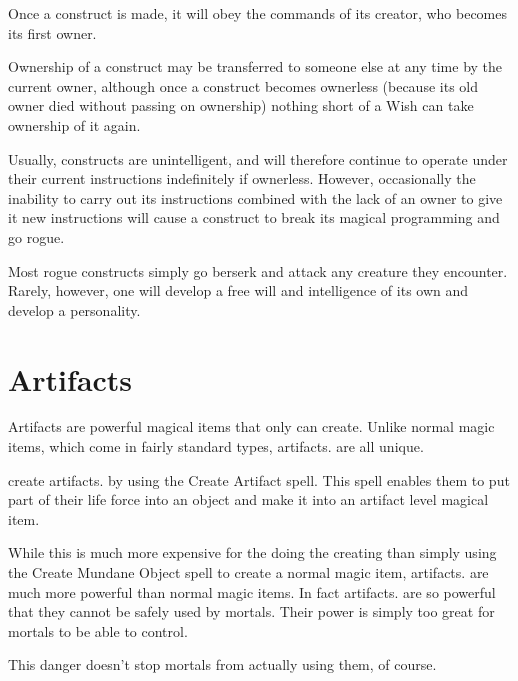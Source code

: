 \begin{multicols*}{2}

Once a construct is made, it will obey the commands of its creator, who becomes its first owner.

Ownership of a construct may be transferred to someone else at any time by the current owner, although once a construct becomes ownerless (because its old owner died without passing on ownership) nothing short of a Wish can take ownership of it again.

Usually, constructs are unintelligent, and will therefore continue to operate under their current instructions indefinitely if ownerless. However, occasionally the inability to carry out its instructions combined with the lack of an owner to give it new instructions will cause a construct to break its magical programming and go rogue.

Most rogue constructs simply go berserk and attack any creature they encounter. Rarely, however, one will develop a free will and intelligence of its own and develop a personality.

\section{Artifacts}\label{sec:Artifacts}
Artifacts are powerful magical items that only  can create. Unlike normal magic items, which come in fairly standard types, artifacts. are all unique.

 create artifacts. by using the Create Artifact spell. This spell enables them to put part of their life force into an object and make it into an artifact level magical item.

While this is much more expensive for the  doing the creating than simply using the Create Mundane Object spell to create a normal magic item, artifacts. are much more powerful than normal magic items. In fact artifacts. are so powerful that they cannot be safely used by mortals. Their power is simply too great for mortals to be able to control.

This danger doesn’t stop mortals from actually using them, of course.


\end{multicols*}
